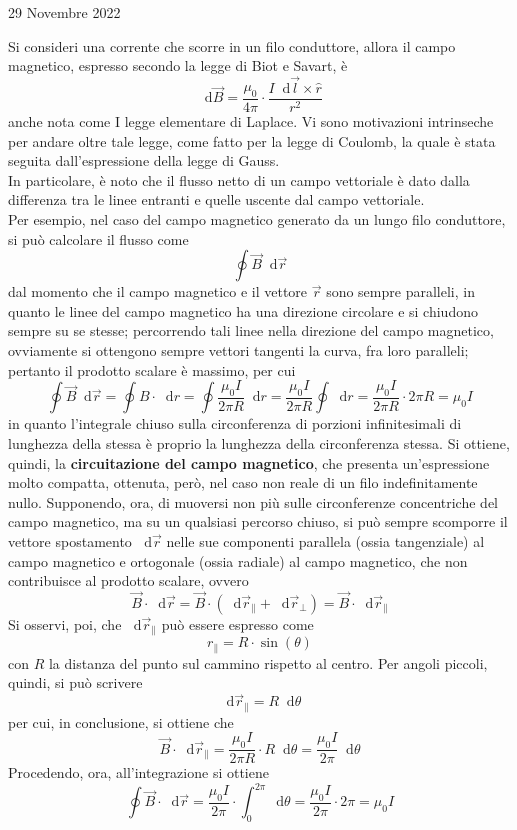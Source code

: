 \documentclass[a4paper]{extarticle}
\newcommand\dif{\mathop{}\!\mathrm{d}}
\begin{document}
\newpage
\noindent
\begin{center}
    29 Novembre 2022
\end{center}
Si consideri una corrente che scorre in un filo conduttore, allora il campo magnetico, espresso secondo la legge di Biot e Savart, è
\[\dif \vec B = \frac{\mu_0}{4 \pi} \cdot \frac{I \dif \vec l \times \hat r}{r^2}\]
anche nota come I legge elementare di Laplace. Vi sono motivazioni intrinseche per andare oltre tale legge, come fatto per la legge di Coulomb, la quale è stata seguita dall'espressione della legge di Gauss.\\
In particolare, è noto che il flusso netto di un campo vettoriale è dato dalla differenza tra le linee entranti e quelle uscente dal campo vettoriale.\\
Per esempio, nel caso del campo magnetico generato da un lungo filo conduttore, si può calcolare il flusso come
\[\oint \vec B \dif \vec r\]
dal momento che il campo magnetico e il vettore $\vec r$ sono sempre paralleli, in quanto le linee del campo magnetico ha una direzione circolare e si chiudono sempre su se stesse; percorrendo tali linee nella direzione del campo magnetico, ovviamente si ottengono sempre vettori tangenti la curva, fra loro paralleli; pertanto il prodotto scalare è massimo, per cui
\[\oint \vec B \dif \vec r = \oint B \cdot \dif r = \oint \dfrac{\mu_0 I}{2 \pi R} \dif r = \dfrac{\mu_0 I}{2 \pi R} \oint \dif r = \dfrac{\mu_0 I}{2 \pi R} \cdot 2\pi R = \mu_0 I\]
in quanto l'integrale chiuso sulla circonferenza di porzioni infinitesimali di lunghezza della stessa è proprio la lunghezza della circonferenza stessa. Si ottiene, quindi, la \textbf{circuitazione del campo magnetico}, che presenta un'espressione molto compatta, ottenuta, però, nel caso non reale di un filo indefinitamente nullo.
Supponendo, ora, di muoversi non più sulle circonferenze concentriche del campo magnetico, ma su un qualsiasi percorso chiuso, si può sempre scomporre il vettore spostamento $\dif \vec r$ nelle sue componenti parallela (ossia tangenziale) al campo magnetico e ortogonale (ossia radiale) al campo magnetico, che non contribuisce al prodotto scalare, ovvero
\[\vec B \cdot \dif \vec r = \vec B \cdot (\dif \vec r_{\parallel} + \dif \vec r_\perp) = \vec B \cdot \dif \vec r_{\parallel}\]
Si osservi, poi, che $\dif \vec r_{\parallel}$ può essere espresso come
\[r_\parallel = R \cdot \sin(\theta)\]
con $R$ la distanza del punto sul cammino rispetto al centro. Per angoli piccoli, quindi, si può scrivere
\[\dif \vec r_\parallel = R \dif \theta\]
per cui, in conclusione, si ottiene che
\[\vec B \cdot \dif \vec r_\parallel = \dfrac{\mu_0 I}{2 \pi R} \cdot R \dif \theta = \dfrac{\mu_0 I}{2\pi} \dif \theta\]
Procedendo, ora, all'integrazione si ottiene
\[\oint \vec B \cdot \dif \vec r = \dfrac{\mu_0 I}{2 \pi} \cdot \int_0^{2\pi} \dif \theta = \frac{\mu_0 I}{2 \pi} \cdot 2\pi = \mu_0 I\]
\end{document}
